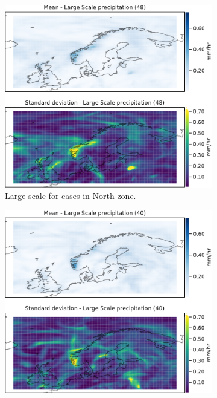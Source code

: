 \begin{figure}[H]
\begin{subfigure}[b]{0.49\textwidth}
    \centering
    \includegraphics[width=\textwidth]{Figures/lsPNord.pdf}
    \caption{Large scale for cases in North zone.}
    \label{fig:NordlsP}
\end{subfigure}
\begin{subfigure}[b]{0.49\textwidth}
    \centering
    \includegraphics[width=\textwidth]{Figures/lsPNordvest.pdf}

\end{subfigure}
\end{figure}
